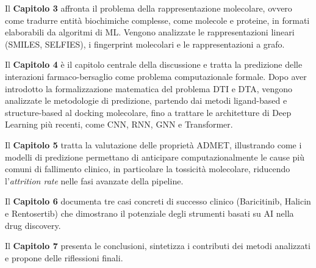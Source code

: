 Il \textbf{Capitolo 3} affronta il problema della 
rappresentazione molecolare, ovvero come tradurre entità 
biochimiche complesse, come molecole e proteine, in formati 
elaborabili da algoritmi di ML. 
Vengono analizzate le 
rappresentazioni lineari (SMILES, SELFIES), i fingerprint 
molecolari e le rappresentazioni a grafo.

Il \textbf{Capitolo 4} è il capitolo centrale della discussione 
e tratta la predizione delle interazioni farmaco-bersaglio 
come problema computazionale formale. Dopo aver introdotto 
la formalizzazione matematica del problema DTI e DTA, 
vengono analizzate le metodologie di predizione, partendo dai 
metodi ligand-based e structure-based al docking 
molecolare, fino a trattare le architetture di Deep Learning 
più recenti, come CNN, RNN, GNN e Transformer.

Il \textbf{Capitolo 5} tratta la valutazione delle 
proprietà ADMET, illustrando come i modelli di predizione permettano di 
anticipare computazionalmente le cause più comuni di 
fallimento clinico, in particolare la tossicità molecolare, riducendo l'\textit{attrition rate} 
nelle fasi avanzate della pipeline.

Il \textbf{Capitolo 6} documenta tre casi concreti di successo clinico (Baricitinib, Halicin e Rentosertib) che dimostrano il potenziale degli strumenti basati su AI 
nella drug discovery.

Il \textbf{Capitolo 7}
presenta le conclusioni, 
sintetizza i contributi dei metodi analizzati e propone delle riflessioni finali.
